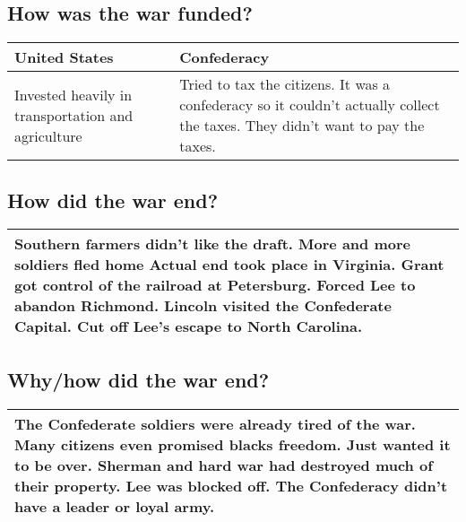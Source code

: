 \documentclass{article}
\begin{document}
\subsection{How was the war funded?}
\begin{tabular}{|p{7cm}|p{7cm}|}
    \hline
    United States & Confederacy \\
    \hline
    Invested heavily in transportation and agriculture
    &
    Tried to tax the citizens. It was a confederacy so it couldn't actually
    collect the taxes. They didn't want to pay the taxes.
    \\
    \hline
\end{tabular}

\subsection{How did the war end?}
\begin{tabular}{|p{14cm}|}
    \hline
    Southern farmers didn't like the draft. More and more soldiers fled home
    Actual end took place in Virginia. Grant got control of the railroad at
    Petersburg. Forced Lee to abandon Richmond. Lincoln visited the
    Confederate Capital. Cut off Lee's escape to North Carolina.
    \\
    \hline
\end{tabular}

\subsection{Why/how did the war end?}
\begin{tabular}{|p{14cm}|}
    \hline
    The Confederate soldiers were already tired of the war. Many citizens even
    promised blacks freedom. Just wanted it to be over. Sherman and hard war
    had destroyed much of their property. Lee was blocked off. The Confederacy
    didn't have a leader or loyal army.
    \\
    \hline
\end{tabular}
\end{document}
